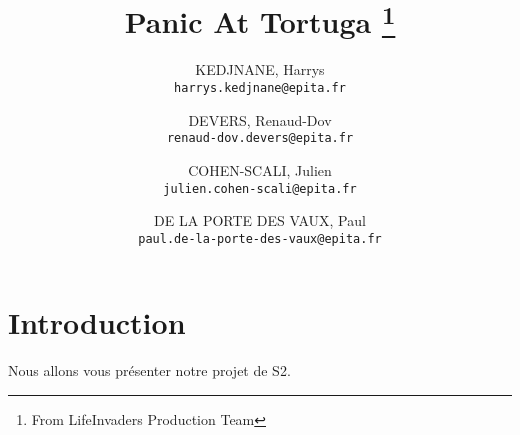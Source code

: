\documentclass{article}
\title{Panic At Tortuga \thanks{From LifeInvaders Production Team}}
\author{
    KEDJNANE, Harrys\\
    \texttt{harrys.kedjnane@epita.fr}
    \and
    DEVERS, Renaud-Dov\\
    \texttt{renaud-dov.devers@epita.fr}
    \and
    COHEN-SCALI, Julien\\
    \texttt{julien.cohen-scali@epita.fr}
    \and
    DE LA PORTE DES VAUX, Paul\\
    \texttt{paul.de-la-porte-des-vaux@epita.fr}
    
}
\begin{document}
    \maketitle
    \newpage
    \section{Introduction}
    Nous allons vous présenter notre projet de S2.
\end{document}
